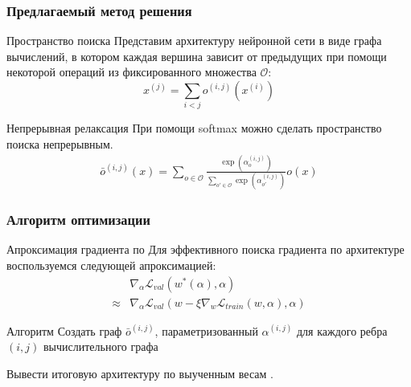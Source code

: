 \documentclass{beamer}
\begin{document}
\begin{frame}
\frametitle{Предлагаемый метод решения}

\begin{block}{Пространство поиска}
Представим архитектуру нейронной сети в виде графа вычислений, в котором каждая вершина зависит от предыдущих при помощи некоторой операций из фиксированного множества $\mathcal{O}$:
\begin{equation}
	x^{(j)} = \sum_{i<j} o^{(i, j)}(x^{(i)})
\end{equation}
\end{block}

\begin{block}{Непрерывная релаксация}
При помощи softmax можно сделать пространство поиска непрерывным.
\begin{align}
	\bar{o}^{(i,j)}(x) = \sum_{o \in \mathcal{O}} \frac{\exp(\alpha_o^{(i,j)})}{\sum_{o' \in \mathcal{O}} \exp(\alpha_{o'}^{(i,j)})} o(x)
	\label{eq:soft}
\end{align}

\end{block}

\end{frame}

\begin{frame}
\frametitle{Алгоритм оптимизации}

\begin{block}{Апроксимация градиента по \alpha}
Для эффективного поиска градиента по архитектуре воспользуемся следующей апроксимацией:
\begin{align}
&\nabla_\alpha \mathcal{L}_{val}(w^*(\alpha), \alpha) \\
\approx &\nabla_\alpha \mathcal{L}_{val}(w - \xi \nabla_{w} \mathcal{L}_{train}(w, \alpha), \alpha) \label{eq:single}
\end{align}
\end{block}

\begin{block}{Алгоритм}
\DontPrintSemicolon
Создать граф $\bar{o}^{(i,j)}$, параметризованный $\alpha^{(i,j)}$ для каждого ребра $(i,j)$ вычислительного графа\;

Вывести итоговую архитектуру по выученным весам \alpha.
\label{algo:pseudocode}
\end{block}

\end{frame}
\end{document}
